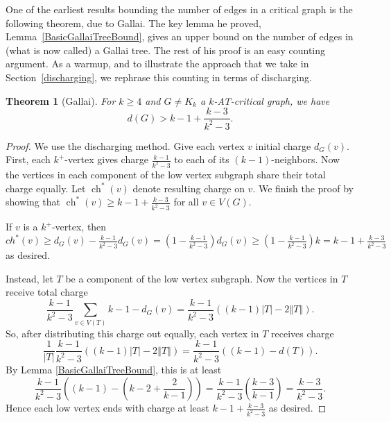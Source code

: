 \documentclass[12pt]{article}
\theoremstyle{plain}
\newtheorem{thm}{Theorem}[section]
\theoremstyle{definition}
\theoremstyle{remark}
\newcommand{\size}[1]{\left\Vert#1\right\Vert}
\newcommand{\parens}[1]{\left( #1 \right)}
\newcommand{\ch}{\operatorname{ch}}
\begin{document}
One of the earliest results bounding the number of edges in a critical graph is the following theorem, due to Gallai.  The key lemma he proved, Lemma~\ref{BasicGallaiTreeBound}, gives an upper bound on the number of edges in (what is now called) a Gallai tree.  The rest of his proof is an easy counting argument.  As a warmup, and to illustrate the approach that we take in Section~\ref{discharging}, we rephrase this counting in terms of discharging.

\begin{thm}[Gallai]
\label{thm:Gallai}
	For $k \ge 4$ and $G \ne K_k$ a $k$-AT-critical graph, we have
	\[d(G) > k-1 + \frac{k-3}{k^2-3}.\]
\end{thm}
\begin{proof}
    We use the discharging method. Give each vertex $v$ initial charge $d_G(v)$.  First, each $k^+$-vertex gives charge
    $\frac{k-1}{k^2-3}$ to each of its $(k-1)$-neighbors.  Now the vertices in each component of the low vertex subgraph share  
    their total charge equally.  Let $\ch^*(v)$ denote resulting charge on $v$.  We finish the proof by showing that $\ch^*(v) 
    \ge k-1 + \frac{k-3}{k^2-3}$ for all $v \in V(G)$.
	
	If $v$ is a $k^+$-vertex, then $ch^*(v) \ge d_G(v) - \frac{k-1}{k^2-3}d_G(v) = \parens{1- \frac{k-1}{k^2-3}}d_G(v) \ge \parens{1- \frac{k-1}{k^2-3}}k = k-1 + \frac{k-3}{k^2-3}$ as desired.

	Instead, let $T$ be a component of the low vertex subgraph.  Now the vertices in $T$ receive total charge
	\[\frac{k-1}{k^2-3}\sum_{v \in V(T)} k-1 - d_G(v) = \frac{k-1}{k^2-3}\parens{(k-1)|T| - 2\size{T}}.\]
	So, after distributing this charge out equally, each vertex in $T$ receives charge
	\[\frac{1}{|T|}\frac{k-1}{k^2-3}((k-1)|T| - 2\size{T}) = \frac{k-1}{k^2-3}\parens{(k-1) - d(T)}.\]
	By Lemma \ref{BasicGallaiTreeBound}, this is at least
	\[\frac{k-1}{k^2-3}\parens{(k-1) - \parens{k-2 + \frac{2}{k-1}}} = \frac{k-1}{k^2-3}\parens{\frac{k-3}{k-1}} = \frac{k-3}{k^2-3}.\]
	Hence each low vertex ends with charge at least $k-1 + \frac{k-3}{k^2-3}$ as desired.
\end{proof}
\end{document}
